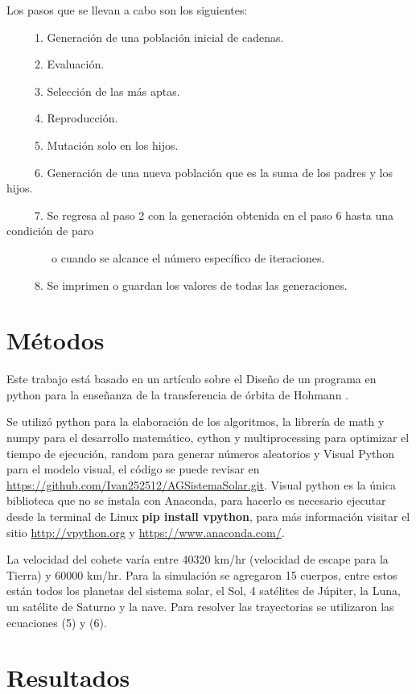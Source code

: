 \documentclass[12pt,letterpaper]{article}
\begin{document}
Los pasos que se llevan a cabo son los siguientes:

\ \ \ \ \ 1. Generación de una población inicial de cadenas.

\ \ \ \ \ 2. Evaluación.

\ \ \ \ \ 3. Selección de las más aptas.

\ \ \ \ \ 4. Reproducción.

\ \ \ \ \ 5. Mutación solo en los hijos.

\ \ \ \ \ 6. Generación de una nueva población que es la suma de los padres y los hijos.

\ \ \ \ \ 7. Se regresa al paso 2 con la generación obtenida en el paso 6 hasta una condición de paro 

\ \ \ \ \ \ \ \ o cuando se alcance el número específico de iteraciones.

\ \ \ \ \ 8. Se imprimen o guardan los valores de todas las generaciones.

\section*{Métodos}

Este trabajo está basado en un artículo sobre el Diseño de un programa en python para la enseñanza de la transferencia de órbita de Hohmann \citep{mendez2016diseno}.

Se utilizó python para la elaboración de los algoritmos, la librería de math y numpy para el desarrollo matemático, cython y multiprocessing para optimizar el tiempo de ejecución, random para generar números aleatorios y Visual Python para el modelo visual, el código se puede revisar en \url{https://github.com/Ivan252512/AGSistemaSolar.git}. Visual python es la única biblioteca que no se instala con Anaconda, para hacerlo es necesario ejecutar desde la terminal de Linux \textbf{pip install vpython}, para más información visitar el sitio \url{http://vpython.org} y \url{https://www.anaconda.com/}.

La velocidad del cohete varía entre 40320 km/hr (velocidad de escape para la Tierra) y 60000 km/hr. Para la simulación se agregaron 15 cuerpos, entre estos están todos los planetas del sistema solar, el Sol, 4 satélites de Júpiter, la Luna, un satélite de Saturno y la nave. Para resolver las trayectorias se utilizaron las ecuaciones (5) y (6).


\section*{Resultados}
\end{document}

